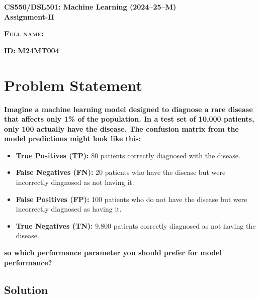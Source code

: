 \documentclass{exam}
\begin{document}
\begin{center}
\textbf{CS550/DSL501: Machine Learning (2024--25--M)} \\
\textbf{Assignment-II}
\end{center}

\vspace{0.2in}

\begin{center}
  \noindent
  \begin{minipage}[t]{0.49\textwidth}
    \raggedright
    \textsc{\textbf{Full name:}} 
  \end{minipage}
  \hfill
  \begin{minipage}[t]{0.49\textwidth}
    \raggedleft
    \textsc{\textbf{ID:}} \textbf{M24MT004}
  \end{minipage}
\end{center}

\vspace{0.2in}

\section{Problem Statement}
\textbf{Imagine a machine learning model designed to diagnose a rare disease that affects only 1\% of the population. In a test set of 10,000 patients, only 100 actually have the disease. The confusion matrix from the model predictions might look like this:}

\begin{itemize}
    \item \textbf{True Positives (TP):} 80 patients correctly diagnosed with the disease.
    \item \textbf{False Negatives (FN):} 20 patients who have the disease but were incorrectly diagnosed as not having it.
    \item \textbf{False Positives (FP):} 100 patients who do not have the disease but were incorrectly diagnosed as having it.
    \item \textbf{True Negatives (TN):} 9,800 patients correctly diagnosed as not having the disease.
\end{itemize}

\textbf{so which performance parameter you should prefer for model performance?}

\subsection{Solution}
\end{document}

